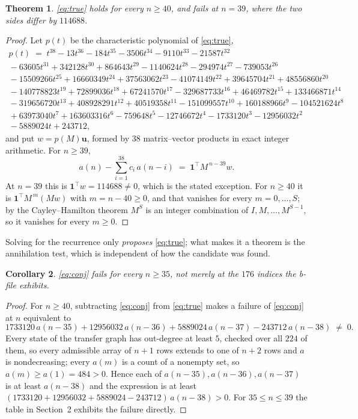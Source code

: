 \documentclass[11pt,a4paper]{article}
\theoremstyle{plain}
\newtheorem{theorem}{Theorem}
\newtheorem{corollary}[theorem]{Corollary}
\theoremstyle{definition}
\begin{document}
\begin{theorem}\label{thm:true}
\eqref{eq:true} holds for every $n\ge40$, and fails at $n=39$, where the two sides differ by
$114688$.
\end{theorem}

\begin{proof}
Let $p(t)$ be the characteristic polynomial of \eqref{eq:true},
\begin{multline*}
p(t)\;=\;t^{38} - 13t^{36} - 184t^{35} - 3506t^{34} - 9110t^{33} - 21587t^{32}\\
{}- 63605t^{31} + 342128t^{30} + 864643t^{29} - 1140624t^{28} - 294974t^{27} - 739053t^{26}\\
{}- 15509266t^{25} + 16660349t^{24} + 37563062t^{23} - 41074149t^{22} + 39645704t^{21} + 48556860t^{20}\\
{}- 140778823t^{19} + 72899036t^{18} + 67241570t^{17} - 329687733t^{16} + 46469782t^{15} + 133466871t^{14}\\
{}- 319656720t^{13} + 408928291t^{12} + 40519358t^{11} - 151099557t^{10} + 160188966t^{9} - 104521624t^{8}\\
{}+ 63973040t^{7} + 163603316t^{6} - 759648t^{5} - 12746672t^{4} - 1733120t^{3} - 12956032t^{2}\\
{}- 5889024t + 243712,
\end{multline*}
and put $w=p(M)\mathbf u$, formed by $38$ matrix--vector products in exact integer
arithmetic. For $n\ge39$,
\[
a(n)-\sum_{i=1}^{38}c_i\,a(n-i)\;=\;\mathbf1^{\!\top}M^{\,n-39}w .
\]
At $n=39$ this is $\mathbf1^{\!\top}w=114688\ne0$, which is the stated exception. For
$n\ge40$ it is $\mathbf1^{\!\top}M^{\,m}(Mw)$ with $m=n-40\ge0$, and that vanishes for every
$m=0,\dots,S$; by the Cayley--Hamilton theorem $M^{S}$ is an integer combination of
$I,M,\dots,M^{S-1}$, so it vanishes for every $m\ge0$.
\end{proof}

Solving for the recurrence only \emph{proposes} \eqref{eq:true}; what makes it a theorem is
the annihilation test, which is independent of how the candidate was found.

\begin{corollary}
\eqref{eq:conj} fails for every $n\ge35$, not merely at the $176$ indices the b-file
exhibits.
\end{corollary}

\begin{proof}
For $n\ge40$, subtracting \eqref{eq:conj} from \eqref{eq:true} makes a failure of
\eqref{eq:conj} at $n$ equivalent to
\[
1733120\,a(n-35)+12956032\,a(n-36)+5889024\,a(n-37)-243712\,a(n-38)\;\ne\;0 .
\]
Every state of the transfer graph has out-degree at least $5$, checked over all $224$ of
them, so every admissible array of $n+1$ rows extends to one of $n+2$ rows and $a$ is
nondecreasing; every $a(m)$ is a count of a nonempty set, so $a(m)\ge a(1)=484>0$. Hence
each of $a(n-35),a(n-36),a(n-37)$ is at least $a(n-38)$ and the expression is at least
$(1733120+12956032+5889024-243712)\,a(n-38)>0$. For $35\le n\le39$ the table in Section~2
exhibits the failure directly.
\end{proof}
\end{document}
